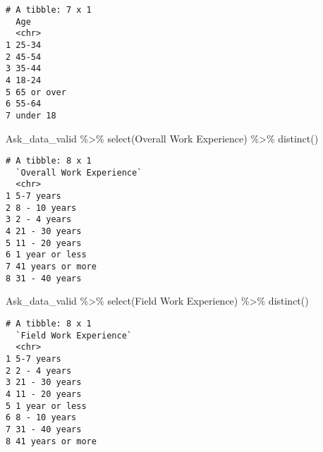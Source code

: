 \documentclass[
  letterpaper,
  DIV=11,
  numbers=noendperiod]{scrartcl}
\newenvironment{Shaded}{\begin{snugshade}}{\end{snugshade}}
\newcommand{\AttributeTok}[1]{\textcolor[rgb]{0.40,0.45,0.13}{#1}}
\newcommand{\FunctionTok}[1]{\textcolor[rgb]{0.28,0.35,0.67}{#1}}
\newcommand{\NormalTok}[1]{\textcolor[rgb]{0.00,0.23,0.31}{#1}}
\newcommand{\SpecialCharTok}[1]{\textcolor[rgb]{0.37,0.37,0.37}{#1}}
\newcommand{\StringTok}[1]{\textcolor[rgb]{0.13,0.47,0.30}{#1}}
\begin{document}
\begin{verbatim}
# A tibble: 7 x 1
  Age       
  <chr>     
1 25-34     
2 45-54     
3 35-44     
4 18-24     
5 65 or over
6 55-64     
7 under 18  
\end{verbatim}

\begin{Shaded}
\begin{Highlighting}[]
\NormalTok{Ask\_data\_valid }\SpecialCharTok{\%\textgreater{}\%} \FunctionTok{select}\NormalTok{(}\StringTok{\textasciigrave{}}\AttributeTok{Overall Work Experience}\StringTok{\textasciigrave{}}\NormalTok{) }\SpecialCharTok{\%\textgreater{}\%} \FunctionTok{distinct}\NormalTok{()}
\end{Highlighting}
\end{Shaded}

\begin{verbatim}
# A tibble: 8 x 1
  `Overall Work Experience`
  <chr>                    
1 5-7 years                
2 8 - 10 years             
3 2 - 4 years              
4 21 - 30 years            
5 11 - 20 years            
6 1 year or less           
7 41 years or more         
8 31 - 40 years            
\end{verbatim}

\begin{Shaded}
\begin{Highlighting}[]
\NormalTok{Ask\_data\_valid }\SpecialCharTok{\%\textgreater{}\%} \FunctionTok{select}\NormalTok{(}\StringTok{\textasciigrave{}}\AttributeTok{Field Work Experience}\StringTok{\textasciigrave{}}\NormalTok{) }\SpecialCharTok{\%\textgreater{}\%} \FunctionTok{distinct}\NormalTok{()}
\end{Highlighting}
\end{Shaded}

\begin{verbatim}
# A tibble: 8 x 1
  `Field Work Experience`
  <chr>                  
1 5-7 years              
2 2 - 4 years            
3 21 - 30 years          
4 11 - 20 years          
5 1 year or less         
6 8 - 10 years           
7 31 - 40 years          
8 41 years or more       
\end{verbatim}
\end{document}
